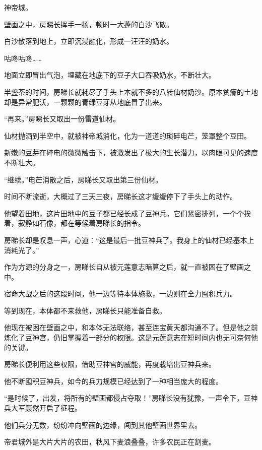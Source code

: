 
\begin{this_body}



神帝城。

壁画之中，房睇长挥手一扬，顿时一大蓬的白沙飞散。

白沙散落到地上，立即沉浸融化，形成一汪汪的奶水。

咕咚咕咚……

地面立即冒出气泡，埋藏在地底下的豆子大口吞吸奶水，不断壮大。

半盏茶的时间，房睇长就耗尽了手头上本就不多的八转仙材奶沙。原本贫瘠的土地却是异常肥沃，一颗颗的青绿豆芽从地底冒了出来。

“再来。”房睇长又取出一份雷道仙材。

仙材抛洒到半空中，就被神帝城消化，化为一道道的琐碎电芒，笼罩整个豆田。

新嫩的豆芽在碎电的微微触击下，被激发出了极大的生长潜力，以肉眼可见的速度不断壮大。

“继续。”电芒消散之后，房睇长又取出第三份仙材。

时间不断流逝，大概过了三天三夜，房睇长这才缓缓停下了手头上的动作。

他望着田地，这片田地中的豆子都已经长成了豆神兵。它们紧密排列，一个个挨着，寂静如石像，都在等候着房睇长的指令。

房睇长却是叹息一声，心道：“这是最后一批豆神兵了。我身上的仙材已经基本上消耗光了。”

作为方源的分身之一，房睇长自从被元莲意志暗算之后，就一直被困在了壁画之中。

宿命大战之后的这段时间，他一边等待本体施救，一边则在全力囤积兵力。

等到现在，本体都不来救他，房睇长只能准备自救。

他现在被困在壁画之中，和本体无法联络，甚至连宝黄天都沟通不了。但是他之前炼化了豆神宫，仍旧掌握着一部分的权限。这是元莲意志在短时间内也无可奈何他的关键。

房睇长便利用这些权限，借助豆神宫的威能，再度栽培出豆神兵来。

他不断囤积豆神兵，如今的兵力规模已经达到了一种相当庞大的程度。

“是时候了，出发，将所有的壁画都侵占夺取！”房睇长没有犹豫，一声令下，豆神兵大军轰然开启了征程。

他们兵分无数，纷纷冲向壁画的边缘，闯到其他壁画世界里去。

帝君城外是大片大片的农田，秋风下麦浪叠叠，许多农民正在割麦。


\end{this_body}
